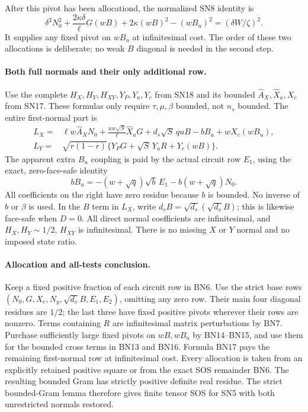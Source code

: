 After this pivot has been allocationd, the normalized SN8 identity is
\[
 \delta^2N_0^2+\frac{2\kappa\delta}{\ell}G(wB)
          +2\kappa(wB)^2-(wB_u)^2
                         =(\delta W/\zeta)^2.
 \tag{BN15}
\]
It supplies any fixed pivot on $wB_u$ at infinitesimal cost. The order of
these two allocations is deliberate; no weak $B$ diagonal is needed
in the second step.

\paragraph{Both full normals and their only additional row.}
Use the complete $H_X,H_Y,H_{XY},Y_P,Y_a,Y_c$ from SN18 and its
bounded $\widehat A_X,\widehat X_a,X_c$ from SN17. These formulas
only require $\tau,\mu,\beta$ bounded, not $n_s$ bounded.
The entire first-normal part is
\[
\begin{split}
 L_X={}&\ell w\widehat A_XN_0
       +\frac{uw\sqrt S}{\ell}\widehat X_aG
       +d_s\sqrt S\,quB-bB_u+wX_c(wB_u),\\
 L_Y={}&\sqrt{r(1-r)}\{Y_PG+\sqrt S\,Y_aR+Y_c(wB)\}.
\end{split}\tag{BN16}
\]
The apparent extra $B_u$ coupling is paid by the actual circuit row
$E_1$, using the exact, zero-face-safe identity
\[
 bB_u=-(w+\sqrt q)\sqrt b\,E_1-b(w+\sqrt q)N_0.
 \tag{BN17}
\]
All coefficients on the right have zero residue because $b$ is
bounded. No inverse of $b$ or $\beta$ is used. In the $B$ term in
$L_X$, write $d_sB=\sqrt{d_s}(\sqrt{d_s}B)$; this is likewise
face-safe when $D=0$. All direct normal coefficients are
infinitesimal, and $H_X,H_Y\sim1/2$, $H_{XY}$ is infinitesimal.
There is no missing $X$ or $Y$ normal and no imposed state ratio.

\paragraph{Allocation and all-tests conclusion.}
Keep a fixed positive fraction of each circuit row in BN6.
Use the strict base rows $(N_0,G,X_e,N_y,\sqrt{d_s}B,E_1,E_2)$,
omitting any zero row. Their main four diagonal residues are $1/2$;
the last three have fixed positive pivots wherever their rows are
nonzero. Terms containing $R$ are infinitesimal matrix perturbations
by BN7. Purchase sufficiently large fixed pivots on $wB,wB_u$ by
BN14--BN15, and use them for the bounded cross terms in BN13 and
BN16. Formula BN17 pays the remaining first-normal row at
infinitesimal cost. Every allocation is taken from an explicitly
retained positive square or from the exact SOS remainder BN6.
The resulting bounded Gram has strictly positive definite real
residue. The strict bounded-Gram lemma therefore gives
finite tensor SOS for SN5 with both unrestricted normals restored.

